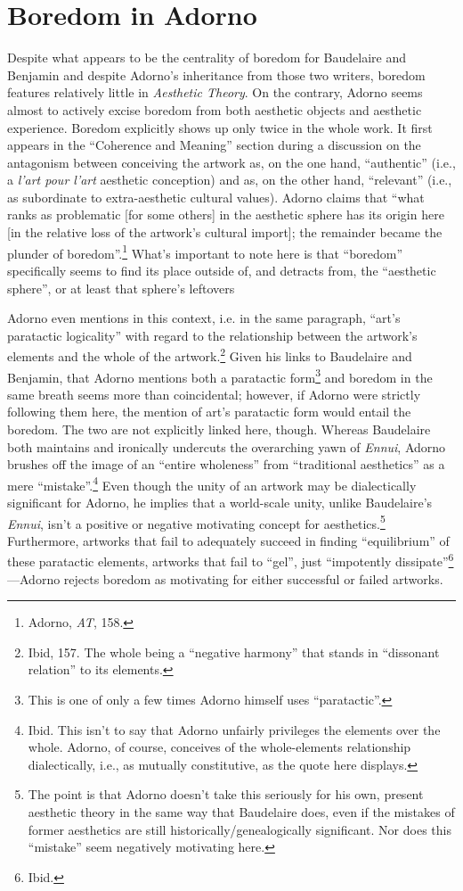 \documentclass[12pt]{article}
\begin{document}
\section{Boredom in Adorno}
Despite what appears to be the centrality of boredom for Baudelaire and Benjamin and despite Adorno's inheritance from those two writers, boredom features relatively little in \textit{Aesthetic Theory}. On the contrary, Adorno seems almost to actively excise boredom from both aesthetic objects and aesthetic experience. Boredom explicitly shows up only twice in the whole work. It first appears in the ``Coherence and Meaning'' section during a discussion on the antagonism between conceiving the artwork as, on the one hand, ``authentic'' (i.e., a \textit{l'art pour l'art} aesthetic conception) and as, on the other hand, ``relevant'' (i.e., as subordinate to extra-aesthetic cultural values). Adorno claims that ``what ranks as problematic [for some others] in the aesthetic sphere has its origin here [in the relative loss of the artwork's cultural import]; the remainder became the plunder of boredom''.\footnote{Adorno, \textit{AT}, 158.} What's important to note here is that ``boredom'' specifically seems to find its place outside of, and detracts from, the ``aesthetic sphere'', or at least that sphere's leftovers  

Adorno even mentions in this context, i.e. in the same paragraph, ``art's paratactic logicality'' with regard to the relationship between the artwork's elements and the whole of the artwork.\footnote{Ibid, 157. The whole being a ``negative harmony'' that stands in ``dissonant relation'' to its elements.} Given his links to Baudelaire and Benjamin, that Adorno mentions both a paratactic form\footnote{This is one of only a few times Adorno himself uses ``paratactic''.} and boredom in the same breath seems more than coincidental; however, if Adorno were strictly following them here, the mention of art's paratactic form would entail the boredom. The two are not explicitly linked here, though. Whereas Baudelaire both maintains and ironically undercuts the overarching yawn of \textit{Ennui}, Adorno brushes off the image of an ``entire wholeness'' from ``traditional aesthetics'' as a mere ``mistake''.\footnote{Ibid. This isn't to say that Adorno unfairly privileges the elements over the whole. Adorno, of course, conceives of the whole-elements relationship dialectically, i.e., as mutually constitutive, as the quote here displays.} Even though the unity of an artwork may be dialectically significant for Adorno, he implies that a world-scale unity, unlike Baudelaire's \textit{Ennui}, isn't a positive or negative motivating concept for aesthetics.\footnote{The point is that Adorno doesn't take this seriously for his own, present aesthetic theory in the same way that Baudelaire does, even if the mistakes of former aesthetics are still historically/genealogically significant. Nor does this ``mistake'' seem negatively motivating here.} Furthermore, artworks that fail to adequately succeed in finding ``equilibrium'' of these paratactic elements, artworks that fail to ``gel'', just ``impotently dissipate''\footnote{Ibid.}---Adorno rejects boredom as motivating for either successful or failed artworks.   
\end{document}
